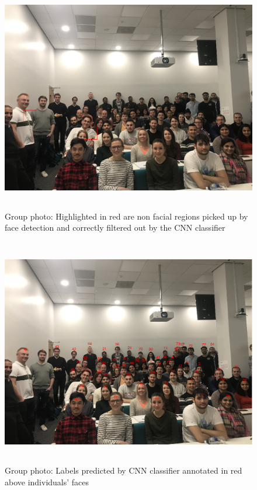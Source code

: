 \documentclass[11pt]{article}
\begin{document}
        \begin{figure}[h]
            \centering
            \includegraphics[height=10cm]{./Images/results/non_faces.png}
            \caption{Group photo: Highlighted in red are non facial regions picked up by face detection and correctly filtered out by the CNN classifier}
            \label{fig:results:non_faces}
        \end{figure}

        \begin{figure}[h]
            \centering
            \includegraphics[height=10cm]{./Images/results/annotated_group.png}
            \caption{Group photo: Labels predicted by CNN classifier annotated in red above individuals' faces}
            \label{fig:results:annotated_group}
        \end{figure}
\end{document}
